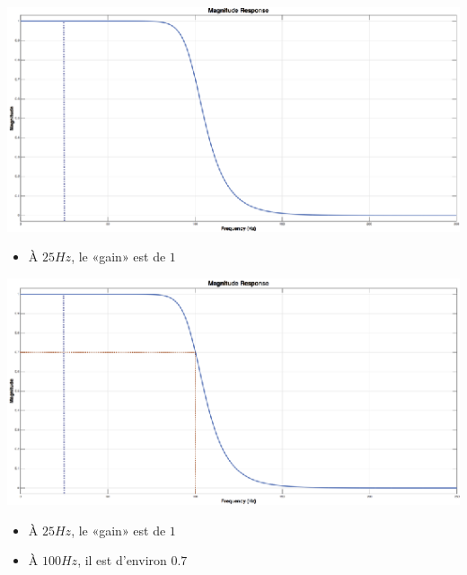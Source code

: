 \documentclass[a4paper,11pt]{beamer}
\begin{document}
\begin{frame}
\centering
\includegraphics[scale=1.5]{images/MagFilter2_BIS.eps}
\begin{itemize}[label=$\bullet$]
  \item À $25Hz$, le «gain» est de $1$
\end{itemize}
\end{frame}

\begin{frame}
\centering
\includegraphics[scale=1.5]{images/MagFilter3_BIS.eps}
\begin{itemize}[label=$\bullet$]
  \item À $25Hz$, le «gain» est de $1$
  \item À $100Hz$, il est d'environ $0.7$
\end{itemize}
\end{frame}
\end{document}
